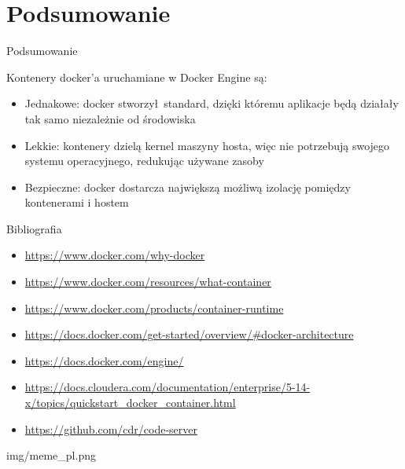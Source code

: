 \documentclass[aspectratio=169]{beamer}
\begin{document}
\section{Podsumowanie}
\begin{frame}{Podsumowanie}
    \begin{card}
        Kontenery docker'a uruchamiane w Docker Engine są:
        \begin{itemize}
            \item Jednakowe: docker stworzył standard, dzięki któremu aplikacje będą działały tak samo niezależnie od środowiska
            \item Lekkie: kontenery dzielą kernel maszyny hosta, więc nie potrzebują swojego systemu operacyjnego, redukując używane zasoby
            \item Bezpieczne: docker dostarcza największą możliwą izolację pomiędzy kontenerami i hostem
        \end{itemize}
    \end{card}
\end{frame}


\begin{frame}{Bibliografia}
    \begin{card}
        \begin{itemize}
            \item \url{https://www.docker.com/why-docker}
            \item \url{https://www.docker.com/resources/what-container}
            \item \url{https://www.docker.com/products/container-runtime}
            \item \url{https://docs.docker.com/get-started/overview/#docker-architecture}
            \item \url{https://docs.docker.com/engine/}
            \item \url{https://docs.cloudera.com/documentation/enterprise/5-14-x/topics/quickstart_docker_container.html}
            \item \url{https://github.com/cdr/code-server}

        \end{itemize}
    \end{card}

\end{frame}

\begin{frameImg}{img/meme_pl.png}
\end{frameImg}
\end{document}
